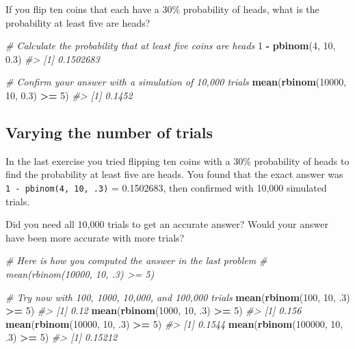 \documentclass[]{article}
\newenvironment{Shaded}{\begin{snugshade}}{\end{snugshade}}
\newcommand{\CommentTok}[1]{\textcolor[rgb]{0.56,0.35,0.01}{\textit{#1}}}
\newcommand{\DecValTok}[1]{\textcolor[rgb]{0.00,0.00,0.81}{#1}}
\newcommand{\FloatTok}[1]{\textcolor[rgb]{0.00,0.00,0.81}{#1}}
\newcommand{\KeywordTok}[1]{\textcolor[rgb]{0.13,0.29,0.53}{\textbf{#1}}}
\newcommand{\NormalTok}[1]{#1}
\newcommand{\OperatorTok}[1]{\textcolor[rgb]{0.81,0.36,0.00}{\textbf{#1}}}
\newcommand{\StringTok}[1]{\textcolor[rgb]{0.31,0.60,0.02}{#1}}
\begin{document}
If you flip ten coins that each have a 30\% probability of heads, what
is the probability at least five are heads?

\begin{Shaded}
\begin{Highlighting}[]
\CommentTok{# Calculate the probability that at least five coins are heads}
\DecValTok{1} \OperatorTok{-}\StringTok{ }\KeywordTok{pbinom}\NormalTok{(}\DecValTok{4}\NormalTok{, }\DecValTok{10}\NormalTok{, }\FloatTok{0.3}\NormalTok{)}
\CommentTok{#> [1] 0.1502683}

\CommentTok{# Confirm your answer with a simulation of 10,000 trials}
\KeywordTok{mean}\NormalTok{(}\KeywordTok{rbinom}\NormalTok{(}\DecValTok{10000}\NormalTok{, }\DecValTok{10}\NormalTok{, }\FloatTok{0.3}\NormalTok{) }\OperatorTok{>=}\StringTok{ }\DecValTok{5}\NormalTok{)}
\CommentTok{#> [1] 0.1452}
\end{Highlighting}
\end{Shaded}

\hypertarget{varying-the-number-of-trials}{%
\subsection{Varying the number of
trials}\label{varying-the-number-of-trials}}

In the last exercise you tried flipping ten coins with a 30\%
probability of heads to find the probability at least five are heads.
You found that the exact answer was \texttt{1\ -\ pbinom(4,\ 10,\ .3)} =
0.1502683, then confirmed with 10,000 simulated trials.

Did you need all 10,000 trials to get an accurate answer? Would your
answer have been more accurate with more trials?

\begin{Shaded}
\begin{Highlighting}[]
\CommentTok{# Here is how you computed the answer in the last problem}
\CommentTok{# mean(rbinom(10000, 10, .3) >= 5)}

\CommentTok{# Try now with 100, 1000, 10,000, and 100,000 trials}
\KeywordTok{mean}\NormalTok{(}\KeywordTok{rbinom}\NormalTok{(}\DecValTok{100}\NormalTok{, }\DecValTok{10}\NormalTok{, }\FloatTok{.3}\NormalTok{) }\OperatorTok{>=}\StringTok{ }\DecValTok{5}\NormalTok{)}
\CommentTok{#> [1] 0.12}
\KeywordTok{mean}\NormalTok{(}\KeywordTok{rbinom}\NormalTok{(}\DecValTok{1000}\NormalTok{, }\DecValTok{10}\NormalTok{, }\FloatTok{.3}\NormalTok{) }\OperatorTok{>=}\StringTok{ }\DecValTok{5}\NormalTok{)}
\CommentTok{#> [1] 0.156}
\KeywordTok{mean}\NormalTok{(}\KeywordTok{rbinom}\NormalTok{(}\DecValTok{10000}\NormalTok{, }\DecValTok{10}\NormalTok{, }\FloatTok{.3}\NormalTok{) }\OperatorTok{>=}\StringTok{ }\DecValTok{5}\NormalTok{)}
\CommentTok{#> [1] 0.1544}
\KeywordTok{mean}\NormalTok{(}\KeywordTok{rbinom}\NormalTok{(}\DecValTok{100000}\NormalTok{, }\DecValTok{10}\NormalTok{, }\FloatTok{.3}\NormalTok{) }\OperatorTok{>=}\StringTok{ }\DecValTok{5}\NormalTok{)}
\CommentTok{#> [1] 0.15212}
\end{Highlighting}
\end{Shaded}
\end{document}
